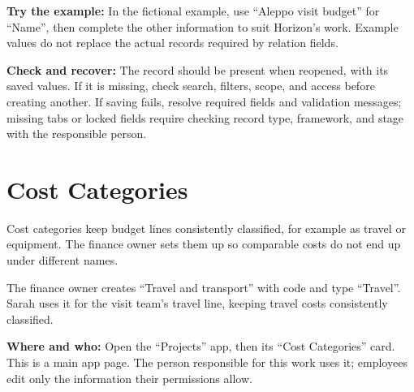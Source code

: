 \textbf{Try the example:} In the fictional example, use “Aleppo visit budget” for “Name”, then complete the other information to suit Horizon's work. Example values do not replace the actual records required by relation fields.

\textbf{Check and recover:} The record should be present when reopened, with its saved values. If it is missing, check search, filters, scope, and access before creating another. If saving fails, resolve required fields and validation messages; missing tabs or locked fields require checking record type, framework, and stage with the responsible person.

\clearpage
\section{Cost Categories}
\label{sec:projects-feature-cost-categories}

Cost categories keep budget lines consistently classified, for example as travel or equipment. The finance owner sets them up so comparable costs do not end up under different names.

\begin{rcnote}
The finance owner creates “Travel and transport” with code  and type “Travel”. Sarah uses it for the visit team’s travel line, keeping travel costs consistently classified.
\end{rcnote}

\textbf{Where and who:} Open the “Projects” app, then its “Cost Categories” card. This is a main app page. The person responsible for this work uses it; employees edit only the information their permissions allow.

